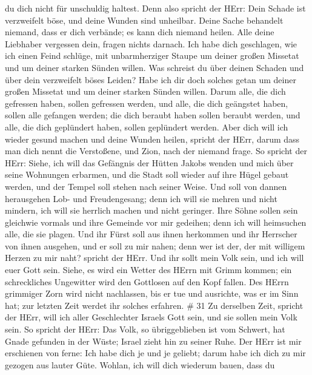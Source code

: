 du dich nicht für unschuldig haltest.  Denn also spricht
der HErr: Dein Schade ist verzweifelt böse, und deine Wunden sind
unheilbar.  Deine Sache behandelt niemand, dass er dich
verbände; es kann dich niemand heilen.  Alle deine
Liebhaber vergessen dein, fragen nichts darnach. Ich habe dich
geschlagen, wie ich einen Feind schlüge, mit unbarmherziger Staupe um
deiner großen Missetat und um deiner starken Sünden willen.
 Was schreist du über deinen Schaden und über dein
verzweifelt böses Leiden? Habe ich dir doch solches getan um deiner
großen Missetat und um deiner starken Sünden willen.  Darum
alle, die dich gefressen haben, sollen gefressen werden, und alle, die
dich geängstet haben, sollen alle gefangen werden; die dich beraubt
haben sollen beraubt werden, und alle, die dich geplündert haben, sollen
geplündert werden.  Aber dich will ich wieder gesund machen
und deine Wunden heilen, spricht der HErr, darum dass man dich nennt die
Verstoßene, und Zion, nach der niemand frage.  So spricht
der HErr: Siehe, ich will das Gefängnis der Hütten Jakobs wenden und
mich über seine Wohnungen erbarmen, und die Stadt soll wieder auf ihre
Hügel gebaut werden, und der Tempel soll stehen nach seiner Weise.
 Und soll von dannen herausgehen Lob- und Freudengesang;
denn ich will sie mehren und nicht mindern, ich will sie herrlich machen
und nicht geringer.  Ihre Söhne sollen sein gleichwie
vormals und ihre Gemeinde vor mir gedeihen; denn ich will heimsuchen
alle, die sie plagen.  Und ihr Fürst soll aus ihnen
herkommen und ihr Herrscher von ihnen ausgehen, und er soll zu mir
nahen; denn wer ist der, der mit willigem Herzen zu mir naht? spricht
der HErr.  Und ihr sollt mein Volk sein, und ich will euer
Gott sein.  Siehe, es wird ein Wetter des HErrn mit Grimm
kommen; ein schreckliches Ungewitter wird den Gottlosen auf den Kopf
fallen.  Des HErrn grimmiger Zorn wird nicht nachlassen,
bis er tue und ausrichte, was er im Sinn hat; zur letzten Zeit werdet
ihr solches erfahren. \# 31  Zu derselben Zeit, spricht der
HErr, will ich aller Geschlechter Israels Gott sein, und sie sollen mein
Volk sein.  So spricht der HErr: Das Volk, so übriggeblieben
ist vom Schwert, hat Gnade gefunden in der Wüste; Israel zieht hin zu
seiner Ruhe.  Der HErr ist mir erschienen von ferne: Ich
habe dich je und je geliebt; darum habe ich dich zu mir gezogen aus
lauter Güte.  Wohlan, ich will dich wiederum bauen, dass du
